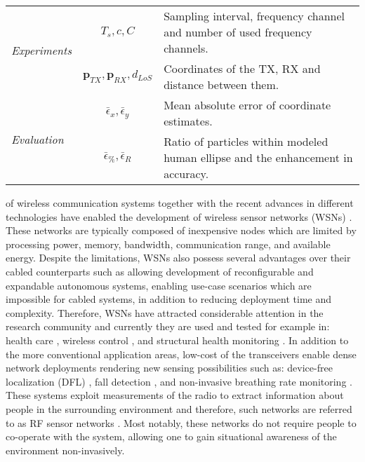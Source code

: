 \documentclass[journal, 10pt, twocolumn, balance]{IEEEtran}
\begin{document}
\begin{table*}
\begin{tabular}{| l | c | l |}
	\multirow{2}{*}{\emph{Experiments}}  & $T_s, c, C$  & Sampling interval, frequency channel and number of used frequency channels.  \\
	& $\bm{p}_{TX}, \bm{p}_{RX}, d_{LoS}$ &  Coordinates of the TX, RX and distance between them.\\ \hline
	
	\multirow{2}{*}{\emph{Evaluation}}  & $\bar{\epsilon}_x, \bar{\epsilon}_y$  & Mean absolute error of coordinate estimates.  \\
	& $\bar{\epsilon}_\%, \bar{\epsilon}_R$ &  Ratio of particles within modeled human ellipse and the enhancement in accuracy.\\ \hline
	
        \end{tabular}
        \label{table:major_notation} \end{table*}

 of wireless communication systems together with the recent advances in different technologies have enabled the development of wireless sensor networks (WSNs) \cite{Akyildiz2002}. These networks are typically composed of inexpensive nodes which are limited by processing power, memory, bandwidth, communication range, and available energy. Despite the limitations, WSNs also possess several advantages over their cabled counterparts such as allowing development of reconfigurable and expandable autonomous systems, enabling use-case scenarios which are impossible for cabled systems, in addition to reducing deployment time and complexity. Therefore, WSNs have attracted considerable attention in the research community and currently they are used and tested for example in: health care \cite{Ko2010b}, wireless control \cite{kaltiokallio2011}, and structural health monitoring \cite{Bocca2011}. In addition to the more conventional application areas, low-cost of the transceivers enable dense network deployments rendering new sensing possibilities such as: device-free localization (DFL) \cite{patwari08}, fall detection \cite{mager2013}, and non-invasive breathing rate monitoring \cite{ Patwari2011}. These systems exploit measurements of the radio to extract information about people in the surrounding environment and therefore, such networks are referred to as RF sensor networks \cite{patwari2010}. Most notably, these networks do not require people to co-operate with the system, allowing one to gain situational awareness of the environment non-invasively. 
	
\end{document}
